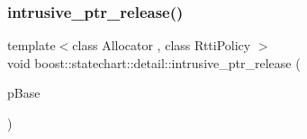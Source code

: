 \subsubsection{\texorpdfstring{intrusive\+\_\+ptr\+\_\+release()}{intrusive\_ptr\_release()}}
{\footnotesize\ttfamily template$<$class Allocator , class Rtti\+Policy $>$ \\
void boost\+::statechart\+::detail\+::intrusive\+\_\+ptr\+\_\+release (\begin{DoxyParamCaption}\item[{const \+::\mbox{\hyperlink{classboost_1_1statechart_1_1detail_1_1state__base}{boost\+::statechart\+::detail\+::state\+\_\+base}}$<$ Allocator, Rtti\+Policy $>$ $\ast$}]{p\+Base }\end{DoxyParamCaption})\hspace{0.3cm}{\ttfamily [inline]}}

